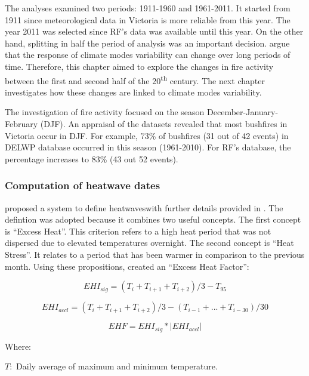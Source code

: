 The analyses examined two periods: 1911-1960 and 1961-2011. It started
from 1911 since meteorological data in Victoria is more reliable from
this year. The year 2011 was selected since RF's data was available
until this year. On the other hand, splitting in half the period of
analysis was an important decision. \citet{Wang2013} argue that the
response of climate modes variability can change over long periods
of time. Therefore, this chapter aimed to explore the changes in fire
activity between the first and second half of the 20\textsuperscript{th}
century. The next chapter investigates how these changes are linked
to climate modes variability.

The investigation of fire activity focused on the season December-January-February
(DJF). An appraisal of the datasets revealed that most bushfires in
Victoria occur in DJF. For example, 73\% of bushfires (31 out of 42
events) in DELWP database occurred in this season (1961-2010). For
RF's database, the percentage increases to 83\% (43 out 52 events).


\subsubsection{Computation of heatwave dates}

\citet{Nairn2009} proposed a system to define heatwaves\textemdash with
further details provided in \citet{Nairn2013}\textemdash . The defintion
was adopted because it combines two useful concepts. The first concept
is ``Excess Heat''. This criterion refers to a high heat period
that was not dispersed due to elevated temperatures overnight. The
second concept is ``Heat Stress''. It relates to a period that has
been warmer in comparison to the previous month. Using these propositions,
\citet{Nairn2009} created an ``Excess Heat Factor'':

\begin{equation}
EHI_{sig}=(T_{i}+T_{i+1}+T_{i+2})/3-T_{95}
\end{equation}


\begin{equation}
EHI_{accl}=(T_{i}+T_{i+1}+T_{i+2})/3-(T_{i-1}+...+T_{i-30})/30
\end{equation}


\begin{equation}
EHF=EHI_{sig}*\left|EHI_{accl}\right|
\end{equation}


Where:

$T:$ Daily average of maximum and minimum temperature.


